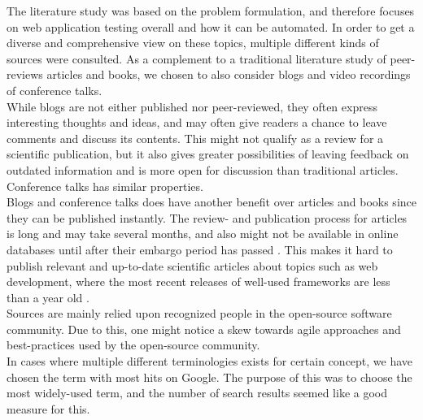 
The literature study was based on the problem formulation, and therefore
focuses on web application testing overall and how it can be automated.
In order to get a diverse and comprehensive view on these topics,
multiple different kinds of sources were consulted. As a
complement to a traditional literature study of peer-reviews articles
and books, we chosen to also consider blogs and video recordings of
conference talks.\\

While blogs are not either published nor peer-reviewed, they often
express  interesting thoughts and ideas, and may often give readers a
chance to leave comments and discuss its contents. This might not
qualify as a review for a scientific publication, but it also gives
greater possibilities of leaving feedback on outdated information and
is more open for discussion than traditional articles. Conference
talks has similar properties.\\

Blogs and conference talks does have another benefit over articles and
books since they can be published instantly. The review- and publication
process for articles is long and may take several months, and also might
not be available in online databases until after their embargo period
has passed \cite{wiki:embargo, pdf:publishing}. This makes it hard to
publish relevant and up-to-date scientific articles about topics such as
web development, where the most recent releases of well-used frameworks
are less than a year old \cite{wiki:rails_versions,
wiki:django_versions, web:knockout_versions}.\\

Sources are mainly relied upon recognized people in the open-source
software community. Due to this, one might notice a skew towards agile
approaches and best-practices used by the open-source community.\\

In cases where multiple different terminologies exists for certain
concept, we have chosen the term with most hits on Google. The purpose
of this was to choose the most widely-used term, and the number of
search results seemed like a good measure for this.\\
